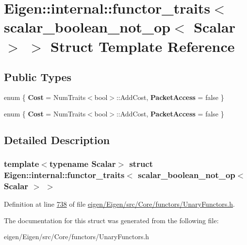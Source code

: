 \hypertarget{struct_eigen_1_1internal_1_1functor__traits_3_01scalar__boolean__not__op_3_01_scalar_01_4_01_4}{}\section{Eigen\+:\+:internal\+:\+:functor\+\_\+traits$<$ scalar\+\_\+boolean\+\_\+not\+\_\+op$<$ Scalar $>$ $>$ Struct Template Reference}
\label{struct_eigen_1_1internal_1_1functor__traits_3_01scalar__boolean__not__op_3_01_scalar_01_4_01_4}
\subsection*{Public Types}
\begin{DoxyCompactItemize}
\item 
\mbox{\label{struct_eigen_1_1internal_1_1functor__traits_3_01scalar__boolean__not__op_3_01_scalar_01_4_01_4_a27440d28fd233df76eaa7dfa17833aa8}} 
enum \{ {\bfseries Cost} = Num\+Traits$<$bool$>$\+:\+:Add\+Cost, 
{\bfseries Packet\+Access} = false
 \}
\item 
\mbox{\label{struct_eigen_1_1internal_1_1functor__traits_3_01scalar__boolean__not__op_3_01_scalar_01_4_01_4_a123f03d027ff247bed1377fe761a5f18}} 
enum \{ {\bfseries Cost} = Num\+Traits$<$bool$>$\+:\+:Add\+Cost, 
{\bfseries Packet\+Access} = false
 \}
\end{DoxyCompactItemize}


\subsection{Detailed Description}
\subsubsection*{template$<$typename Scalar$>$\newline
struct Eigen\+::internal\+::functor\+\_\+traits$<$ scalar\+\_\+boolean\+\_\+not\+\_\+op$<$ Scalar $>$ $>$}



Definition at line \hyperlink{eigen_2_eigen_2src_2_core_2functors_2_unary_functors_8h_source_l00738}{738} of file \hyperlink{eigen_2_eigen_2src_2_core_2functors_2_unary_functors_8h_source}{eigen/\+Eigen/src/\+Core/functors/\+Unary\+Functors.\+h}.



The documentation for this struct was generated from the following file\+:\begin{DoxyCompactItemize}
\item 
eigen/\+Eigen/src/\+Core/functors/\+Unary\+Functors.\+h\end{DoxyCompactItemize}
